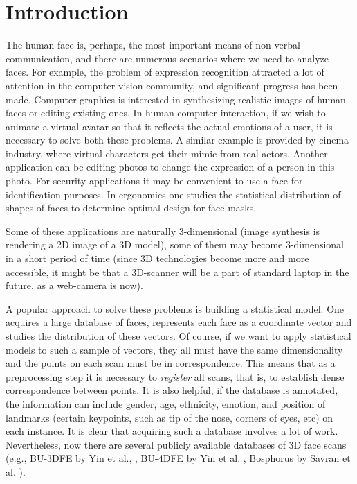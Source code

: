 \chapter{Introduction}


The human face is, perhaps, the most important means of non-verbal 
communication, and there are numerous scenarios where
we need to analyze faces.
For example, the problem of expression recognition
attracted a lot of attention in the computer vision community,
and significant progress has been made.
Computer graphics is interested in synthesizing realistic images 
of human faces or editing existing ones. In human-computer interaction,
if we wish to animate a virtual avatar so that it reflects the actual
emotions of a user, it is necessary to solve both these problems.
A similar example is provided by cinema industry,
where virtual characters get their mimic from real actors.
Another application can be editing photos to change the expression
of a person in this photo. 
For security applications it may be convenient to use
a face for identification purposes.
In ergonomics one studies the statistical distribution 
of shapes of faces to determine optimal design for face masks.


Some of these applications are naturally 3-dimensional (image synthesis
is rendering a 2D image of a 3D model),
some of them may become 3-dimensional in a short period of time (since 3D technologies become more and more accessible,
it might be that a 3D-scanner will be a part of standard laptop
in the future, as a web-camera is now). 


A popular approach to solve these problems 
is building a  statistical model. One acquires a large database of faces,
represents each face as a coordinate vector and studies
the distribution of these vectors. Of course, if we want
to apply statistical models to such a sample of vectors,
they all must have the same dimensionality and the points
on each scan must be in correspondence. This means
that as a preprocessing step it is necessary to \textit{register} 
all scans, that is, to establish dense correspondence between points.
It is also helpful, if the database is annotated, the information
can include gender, age, ethnicity, emotion, and position
of landmarks (certain keypoints, such as tip of the nose, corners of eyes,
etc) on each instance. It is clear that acquiring such a database involves a lot of work.
Nevertheless, now there are several publicly available
databases of 3D face scans (e.g., BU-3DFE by Yin et al., \cite{BU_3DFE}, BU-4DFE by Yin et al.
\cite{BU_4DFE}, Bosphorus by Savran et al. \cite{Savran}).


